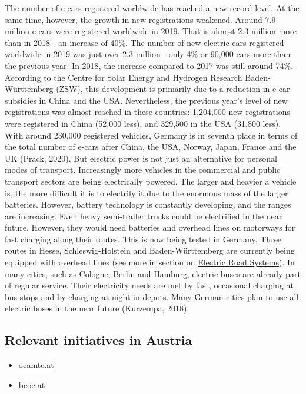 \documentclass[
]{book}
\providecommand{\tightlist}{%
  \setlength{\itemsep}{0pt}\setlength{\parskip}{0pt}}
\begin{document}
The number of e-cars registered worldwide has reached a new record level. At the same time, however, the growth in new registrations weakened. Around 7.9 million e-cars were registered worldwide in 2019. That is almost 2.3 million more than in 2018 - an increase of 40\%.
The number of new electric cars registered worldwide in 2019 was just over 2.3 million - only 4\% or 90,000 cars more than the previous year. In 2018, the increase compared to 2017 was still around 74\%.
According to the Centre for Solar Energy and Hydrogen Research Baden-Württemberg (ZSW), this development is primarily due to a reduction in e-car subsidies in China and the USA. Nevertheless, the previous year's level of new registrations was almost reached in these countries: 1,204,000 new registrations were registered in China (52,000 less), and 329,500 in the USA (31,800 less).
With around 230,000 registered vehicles, Germany is in seventh place in terms of the total number of e-cars after China, the USA, Norway, Japan, France and the UK (Prack, 2020).
But electric power is not just an alternative for personal modes of transport. Increasingly more vehicles in the commercial and public transport sectors are being electrically powered. The larger and heavier a vehicle is, the more difficult it is to electrify it due to the enormous mass of the larger batteries. However, battery technology is constantly developing, and the ranges are increasing. Even heavy semi-trailer trucks could be electrified in the near future. However, they would need batteries and overhead lines on motorways for fast charging along their routes. This is now being tested in Germany. Three routes in Hesse, Schleswig-Holstein and Baden-Württemberg are currently being equipped with overhead lines (see more in section on \protect\hyperlink{ers}{Electric Road Systems}). In many cities, such as Cologne, Berlin and Hamburg, electric buses are already part of regular service. Their electricity needs are met by fast, occasional charging at bus stops and by charging at night in depots. Many German cities plan to use all-electric buses in the near future (Kurzempa, 2018).

\hypertarget{relevant-initiatives-in-austria-47}{%
\subsection*{Relevant initiatives in Austria}\label{relevant-initiatives-in-austria-47}}

\begin{itemize}
\tightlist
\item
  \href{https://www.oeamtc.at/thema/elektromobilitaet/alles-ueber-elektroautos-35420295}{oeamtc.at}
\item
  \href{https://www.beoe.at/statistik/}{beoe.at}
\end{itemize}
\end{document}
